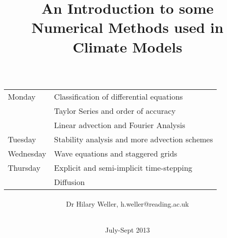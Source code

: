 \title
{
    {\large\normalfont An Introduction to some} \\
    Numerical Methods used in \\
    Climate Models\\ \ \\
    \large\normalfont\begin{tabular}{ll}
    Monday & Classification of differential equations \\
           & Taylor Series and order of accuracy \\
           & Linear advection and Fourier Analysis \\
    Tuesday & Stability analysis and more advection schemes \\
    Wednesday & Wave equations and staggered grids \\
    Thursday  & Explicit and semi-implicit time-stepping \\
              & Diffusion
    \end{tabular}
}

\author
{
    Dr Hilary Weller, \rm{h.weller@reading.ac.uk} \\
    \ \\
}
\date{July-Sept 2013}
\maketitle

